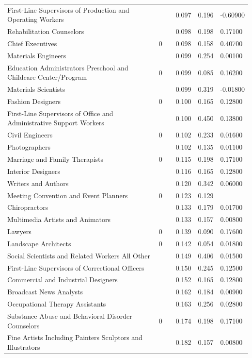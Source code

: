 \documentclass[11pt]{report}
\numberwithin{equation}{chapter}
\begin{document}
\begin{spacing}{2}
\begin{longtable}{ p{} p{} p{}  p{}  p{}  p{} }
First-Line Supervisors of Production and Operating Workers	&		&	&	0.097	&	0.196	&	-0.60900	\\
Rehabilitation Counselors	&		&	&	0.098	&	0.198	&	0.17100	\\
Chief Executives	&	0	&	&	0.098	&	0.158	&	0.40700	\\
Materials Engineers	&		&	&	0.099	&	0.254	&	0.00100	\\
Education Administrators Preschool and Childcare Center/Program	&	0	&	&	0.099	&	0.085	&	0.16200	\\
Materials Scientists	&		&	&	0.099	&	0.319	&	-0.01800	\\
Fashion Designers	&	0	&	&	0.100	&	0.165	&	0.12800	\\
First-Line Supervisors of Office and Administrative Support Workers	&		&	&	0.100	&	0.450	&	0.13800	\\
Civil Engineers	&	0	&	&	0.102	&	0.233	&	0.01600	\\
Photographers	&		&	&	0.102	&	0.135	&	0.01100	\\
Marriage and Family Therapists	&	0	&	&	0.115	&	0.198	&	0.17100	\\
Interior Designers	&		&	&	0.116	&	0.165	&	0.12800	\\
Writers and Authors	&		&	&	0.120	&	0.342	&	0.06000	\\
Meeting Convention and Event Planners	&	0	&	&	0.123	&	0.129	&		\\
Chiropractors	&		&	&	0.133	&	0.179	&	0.01700	\\
Multimedia Artists and Animators	&		&	&	0.133	&	0.157	&	0.00800	\\
Lawyers	&	0	&	&	0.139	&	0.090	&	0.17600	\\
Landscape Architects	&	0	&	&	0.142	&	0.054	&	0.01800	\\
Social Scientists and Related Workers All Other	&		&	&	0.149	&	0.406	&	0.01500	\\
First-Line Supervisors of Correctional Officers	&		&	&	0.150	&	0.245	&	0.12500	\\
Commercial and Industrial Designers	&		&	&	0.152	&	0.165	&	0.12800	\\
Broadcast News Analysts	&		&	&	0.162	&	0.184	&	0.00900	\\
Occupational Therapy Assistants	&		&	&	0.163	&	0.256	&	0.02800	\\
Substance Abuse and Behavioral Disorder Counselors	&	0	&	&	0.174	&	0.198	&	0.17100	\\
Fine Artists Including Painters Sculptors and Illustrators	&		&	&	0.182	&	0.157	&	0.00800	\\

\end{longtable}
\end{spacing}
\end{document}
